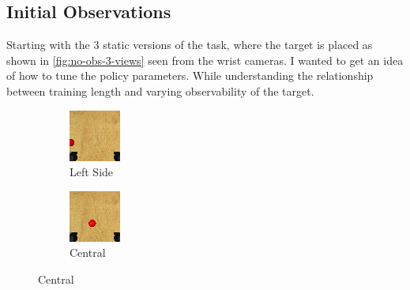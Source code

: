 \subsection{Initial Observations}
Starting with the 3 static versions of the task, where the target is placed as shown in \ref{fig:no-obs-3-views} seen from the wrist cameras. I wanted to get an idea of how to tune the policy parameters. While understanding the relationship between training length and varying observability of the target.

\begin{figure}[htbp]
  \begin{subfigure}{0.3\linewidth}
    \centering
    \includegraphics[width=0.6\linewidth]{assets/cam-comb/reach-no-obs/initial-obs-side_l.png}      
    \caption{Left Side}
  \end{subfigure}
  \hfill
  \begin{subfigure}{0.3\textwidth}
    \centering
    \includegraphics[width=0.6\linewidth]{assets/cam-comb/reach-no-obs/initial-obs-central.png}
    \caption{Central}

\end{subfigure}
\end{figure}

